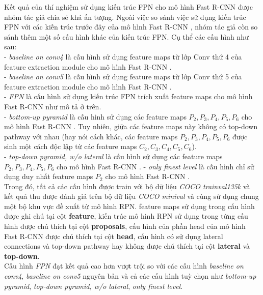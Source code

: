 {    \noindent
    Kết quả của thí nghiệm sử dụng kiến trúc FPN cho mô hình Fast R-CNN  được nhóm tác giả chia sẻ khá ấn tượng.
    Ngoài việc so sánh việc sử dụng kiến trúc FPN với các kiến trúc trước đây của mô hình Fast R-CNN , nhóm tác giả còn so sánh thêm một số cấu hình khác của kiến trúc FPN.
    Cụ thể các cấu hình như sau: \\
    - \textit{baseline on conv4} là cấu hình sử dụng feature maps  từ lớp Conv  thứ 4 của feature extraction module  cho mô hình Fast R-CNN . \\
    - \textit{baseline on conv5} là cấu hình sử dụng feature maps  từ lớp Conv  thứ 5 của feature extraction module  cho mô hình Fast R-CNN . \\
    - \textit{FPN} là cấu hình sử dụng kiến trúc FPN trích xuất feature maps  cho mô hình Fast R-CNN  như mô tả ở trên. \\
    - \textit{bottom-up pyramid} là cấu hình sử dụng các feature maps  \textit{{${P}_{2}, {P}_{3}, {P}_{4}, {P}_{5}, {P}_{6}$}} cho mô hình Fast R-CNN .
    Tuy nhiên, giữa các feature maps  này không có top-down pathway với nhau (hay nói cách khác, các feature maps  \textit{{${P}_{2}, {P}_{3}, {P}_{4}, {P}_{5}, {P}_{6}$}} được sinh một cách độc lập từ các feature maps  \textit{{${C}_{2}, {C}_{3}, {C}_{4}, {C}_{5}, {C}_{6}$}}). \\
    - \textit{top-down pyramid, w/o lateral} là cấu hình sử dụng các feature maps  \textit{{${P}_{2}, {P}_{3}, {P}_{4}, {P}_{5}, {P}_{6}$}} cho mô hình Fast R-CNN .
    - \textit{only finest level} là cấu hình chỉ sử dụng duy nhất feature maps  \textit{${P}_{2}$} cho mô hình Fast R-CNN . \\
    Trong đó, tất cả các cấu hình được train với bộ dữ liệu \textit{COCO trainval135k} và kết quả thu được đánh giá trên bộ dữ liệu \textit{COCO minival} và cùng sử dụng chung một bộ khu vực đề xuất từ mô hình RPN.
    feature maps  sử dụng trong cấu hình được ghi chú tại cột \textbf{feature}, kiến trúc mô hình RPN  \cite{ren2015faster} sử dụng trong từng cấu hình được chú thích tại cột \textbf{proposals}, cấu hình của phần head của mô hình Fast R-CNN  được chú thích tại cột \textbf{head}, cấu hình có sử dụng lateral connections  và top-down pathway hay không được chú thích tại cột \textbf{lateral} và \textbf{top-down}. \\
    Cấu hình \textit{FPN} đạt kết quả cao hơn vượt trội so với các cấu hình \textit{baseline on conv4}, \textit{baseline on conv5} nguyên bản và cả các cấu hình tuỳ chọn như \textit{bottom-up pyramid}, \textit{top-down pyramid, w/o lateral}, \textit{only finest level}.

}
